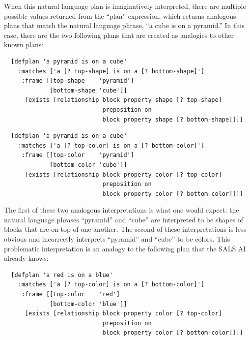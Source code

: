 When this natural language plan is imaginatively interpreted, there
are multiple possible values returned from the ``plan'' expression,
which returns analogous plans that match the natural language phrase,
``a cube is on a pyramid.''  In this case, there are the two following
plans that are created as analogies to other known plans:
\begin{packed_enumerate}
\item{
\begin{samepage}
\begin{Verbatim}
  [defplan 'a pyramid is on a cube'
    :matches ['a [? top-shape] is on a [? bottom-shape]']
     :frame [[top-shape    'pyramid']
             [bottom-shape 'cube']]
      [exists [relationship block property shape [? top-shape]
                            preposition on
                            block property shape [? bottom-shape]]]]
\end{Verbatim}
\end{samepage}
}
\item{
\begin{samepage}
\begin{Verbatim}
  [defplan 'a pyramid is on a cube'
    :matches ['a [? top-color] is on a [? bottom-color]']
     :frame [[top-color    'pyramid']
             [bottom-color 'cube']]
      [exists [relationship block property color [? top-color]
                            preposition on
                            block property color [? bottom-color]]]]
\end{Verbatim}
\end{samepage}
}
\end{packed_enumerate}
The first of these two analogous interpretations is what one would
expect: the natural language phrases ``pyramid'' and ``cube'' are
interpreted to be shapes of blocks that are on top of one another.
The second of these interpretations is less obvious and incorrectly
interprets ``pyramid'' and ``cube'' to be colors.  This problematic
interpretation is an analogy to the following plan that the SALS AI
already knows:
\begin{samepage}
\begin{Verbatim}
  [defplan 'a red is on a blue'
    :matches ['a [? top-color] is on a [? bottom-color]']
     :frame [[top-color    'red']
             [bottom-color 'blue']]
      [exists [relationship block property color [? top-color]
                            preposition on
                            block property color [? bottom-color]]]]
\end{Verbatim}
\end{samepage}
